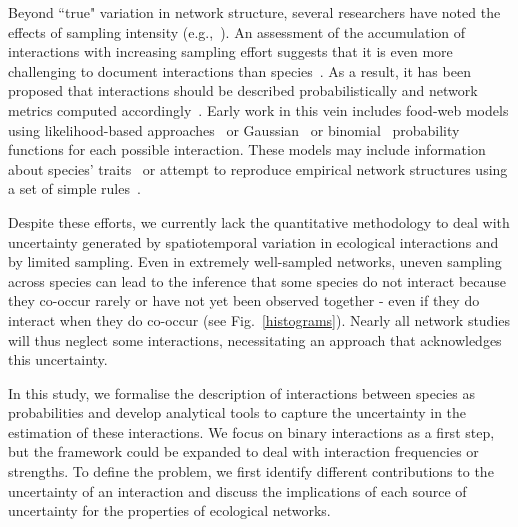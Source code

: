\documentclass[12pt]{article}
\begin{document}
\begin{spacing}{2.0}
    Beyond ``true" variation in network structure, several researchers have noted the effects of sampling intensity (e.g.,~\citealp{Martinez1999,Bluthgen2006,Bluthgen2007}). An assessment of the accumulation of interactions with increasing sampling effort suggests that it is even more challenging to document interactions than species~\citep{Poisot2012}. As a result, it has been proposed that interactions should be described probabilistically and network metrics computed accordingly~\citep{Poisot2016}. Early work in this vein includes food-web models using likelihood-based approaches~\citep{Allesina2008} or Gaussian~\citep{Williams2010} or binomial~\citep{Rohr2016} probability functions for each possible interaction. These models may include information about species' traits~\citep{Rohr2016} or attempt to reproduce empirical network structures using a set of simple rules~\citep{Allesina2008,Williams2010}.


    Despite these efforts, we currently lack the quantitative methodology to deal with uncertainty generated by spatiotemporal variation in ecological interactions and by limited sampling. Even in extremely well-sampled networks, uneven sampling across species can lead to the inference that some species do not interact because they co-occur rarely or have not yet been observed together - even if they do interact when they do co-occur (see Fig.~\ref{histograms}). Nearly all network studies will thus neglect some interactions, necessitating an approach that acknowledges this uncertainty.


    In this study, we formalise the description of interactions between species as probabilities and develop analytical tools to capture the uncertainty in the estimation of these interactions. We focus on binary interactions as a first step, but the framework could be expanded to deal with interaction frequencies or strengths. To define the problem, we first identify different contributions to the uncertainty of an interaction and discuss the implications of each source of uncertainty for the properties of ecological networks. 



\end{spacing}
\end{document}
